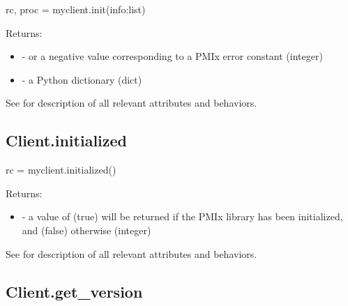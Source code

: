 \pyspecificstart
\begin{codepar}
rc, proc = myclient.init(info:list)
\end{codepar}
\pyspecificend


\begin{arglist}
\end{arglist}

Returns:

\begin{itemize}
    \item {} -  or a negative value corresponding to a PMIx error constant (integer)
    \item {} - a Python  dictionary (dict)
\end{itemize}


See  for description of all relevant attributes and behaviors.


\subsection{Client.initialized}

\format

\pyspecificstart
\begin{codepar}
rc = myclient.initialized()
\end{codepar}
\pyspecificend

Returns:

\begin{itemize}
    \item {} - a value of  (true) will be returned if the \ac{PMIx} library has been initialized, and  (false) otherwise (integer)

\end{itemize}

See  for description of all relevant attributes and behaviors.


\subsection{Client.get_version}

\format

